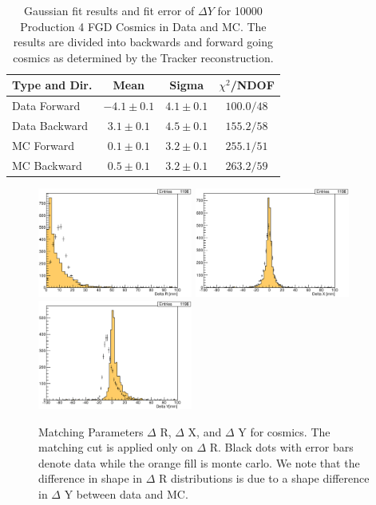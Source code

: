\begin{table}
\centering
\begin{tabular}{lccc}\toprule\midrule
Type and Dir. &  Mean & Sigma & $\chi^2$/NDOF \\ \midrule
Data Forward & $-4.1\pm 0.1$ & $4.1\pm 0.1$ & $100.0/48$  \\
\midrule
Data Backward & $3.1\pm 0.1$ & $4.5\pm 0.1$ & $155.2/58$ \\
\midrule
MC Forward & $0.1\pm 0.1$ & $3.2\pm 0.1$ & $255.1/51$ \\
\midrule
MC Backward & $0.5\pm 0.1$ & $3.2\pm 0.1$ & $263.2/59$ \\
\bottomrule
\end{tabular}
\caption{Gaussian fit results and fit error of $\Delta Y$ for 10000 Production 4 FGD Cosmics in Data and MC. The results are divided into backwards and forward going cosmics as determined by the Tracker reconstruction.}
\label{tab:FitdY}
\end{table}

\begin{figure}
\centering
\includegraphics[width=2in]{Figures/Systematics/MatchingEfficiency/dRcosmics.eps}
\includegraphics[width=2in]{Figures/Systematics/MatchingEfficiency/dXcosmics.eps}
\includegraphics[width=2in]{Figures/Systematics/MatchingEfficiency/dYcosmics.eps} 
\caption{
Matching Parameters $\Delta$ R, $\Delta$ X, and $\Delta$ Y for cosmics. The matching cut is applied only on $\Delta$ R. Black dots with error bars denote data while the orange fill is monte carlo. We note that the difference in shape in $\Delta$ R distributions is due to a shape difference in $\Delta$ Y between data and MC.
}
\label{fig:eff_dR}
\end{figure}

